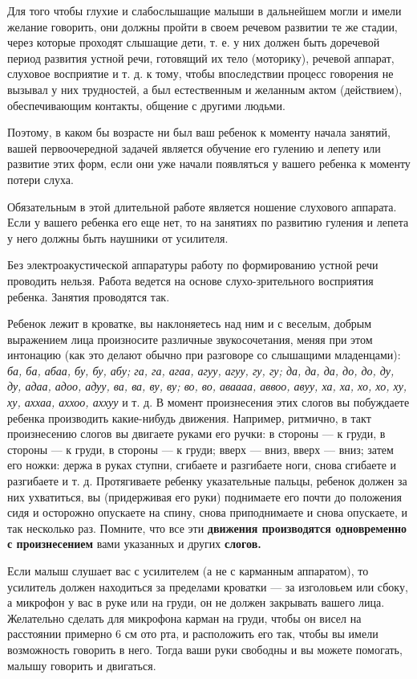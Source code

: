 \documentclass[a5paper]{book}
\renewcommand{\emph}[1]{\textit{#1}}
\begin{document}
Для того чтобы глухие и слабослышащие малыши в дальнейшем могли и имели
желание говорить, они должны пройти в своем речевом развитии те же
стадии, через которые проходят слышащие дети, т. е. у них должен быть
доречевой период развития устной речи, готовящий их тело (моторику),
речевой аппарат, слуховое восприятие и т. д. к тому, чтобы впоследствии
процесс говорения не вызывал у них трудностей, а был естественным и
желанным актом (действием), обеспечивающим контакты, общение с другими
людьми.

Поэтому, в каком бы возрасте ни был ваш ребенок к моменту начала
занятий, вашей первоочередной задачей является обучение его гулению и
лепету или развитие этих форм, если они уже начали появляться у вашего
ребенка к моменту потери слуха.

Обязательным в этой длительной работе является ношение слухового
аппарата. Если у вашего ребенка его еще нет, то на занятиях по развитию
гуления и лепета у него должны быть наушники от усилителя.

Без электроакустической аппаратуры работу по формированию устной речи
проводить нельзя. Работа ведется на основе слухо-зрительного восприятия
ребенка. Занятия проводятся так.

Ребенок лежит в кроватке, вы наклоняетесь над ним и с веселым, добрым
выражением лица произносите различные звукосочетания, меняя при этом
интонацию (как это делают обычно при разговоре со слышащими младенцами):
\emph{ба, ба, абаа, бу, бу, абу; га, га, агаа, агуу, агуу, гу, гу; да,
да, да, до, до, ду, ду, адаа, адоо, адуу, ва, ва, ву, ву; во, во,
аваааа, аввоо, авуу, ха, ха, хо, хо, ху, ху, аххаа, аххоо, аххуу} и т.
д. В момент произнесения этих слогов вы побуждаете ребенка производить
какие-нибудь движения. Например, ритмично, в такт произнесению слогов вы
двигаете руками его ручки: в стороны --- к груди, в стороны --- к груди,
в стороны --- к груди; вверх --- вниз, вверх --- вниз; затем его ножки:
держа в руках ступни, сгибаете и разгибаете ноги, снова сгибаете и
разгибаете и т. д. Протягиваете ребенку указательные пальцы, ребенок
должен за них ухватиться, вы (придерживая его руки) поднимаете его почти
до положения сидя и осторожно опускаете на спину, снова приподнимаете и
снова опускаете, и так несколько раз. Помните, что все эти
\textbf{движения производятся одновременно с произнесением} вами
указанных и других \textbf{слогов.}

Если малыш слушает вас с усилителем (а не с карманным аппаратом), то
усилитель должен находиться за пределами кроватки --- за изголовьем или
сбоку, а микрофон у вас в руке или на груди, он не должен закрывать
вашего лица. Желательно сделать для микрофона карман на груди, чтобы он
висел на расстоянии примерно 6 см ото рта, и расположить его так, чтобы
вы имели возможность говорить в него. Тогда ваши руки свободны и вы
можете помогать, малышу говорить и двигаться.
\end{document}
